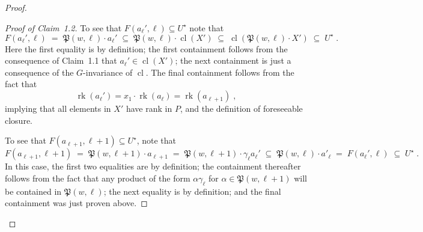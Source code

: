 \documentclass{article}
\theoremstyle{remark}
\theoremstyle{definition}
\DeclareMathOperator{\rk}{rk}
\DeclareMathOperator{\cl}{cl}
\newenvironment{subproof}[1][\proofname]{%
  \renewcommand{\qedsymbol}{$\blacksquare$}%
  \begin{proof}[#1]%
}{%
  \end{proof}%
}
\begin{document}
{\begin{proof}
\begin{subproof}[Proof of Claim~1.2]
To see that $F(a_\ell', \ell)\subseteq U^\star$ note that
  \[F(a_\ell', \ell)\;=\;\mathfrak{P}(w, \ell)\cdot a_\ell'
    \;\subseteq\; \mathfrak{P}(w, \ell)\cdot {\cl}(X')\;{\subseteq}
    \; {\cl}(\mathfrak{P}(w, \ell)\cdot  X')\;\subseteq \;U^\star\;.\]
Here the first equality is by definition; the  first containment follows from the consequence of Claim~1.1 that $a_\ell'\in{\cl}(X')$;  the {next} {containment}
is just a consequence of the {$G$-invariance of $\cl$. The}
final containment follows from the fact that $$\rk(a_\ell')=x_1\cdot\rk(a_\ell)=\rk(a_{\ell+1})\; ,$$ implying that all elements in $X'$ have rank in $P$, and the definition of foreseeable closure. 

To see that $F(a_{\ell+1}, \ell+1)\subseteq U^\star$, note that 
\[F(a_{\ell+1}, \ell+1)\;=\;\mathfrak{P}(w, \ell+1)\cdot  a_{\ell+1}\;=\;\mathfrak{P}(w, \ell+1)\cdot \gamma_\ell a_\ell'\;\subseteq\; \mathfrak{P}(w, \ell) \cdot a'_\ell\;=\; F(a_\ell', \ell)\;\subseteq\; U^\star\;.\]
In this case, the first two equalities are by definition; the  containment thereafter follows from the fact that any product of the form $\alpha\gamma_\ell$ for $\alpha\in \mathfrak{P}(w, \ell+1)$ will be contained in $\mathfrak{P}(w, \ell)$; the next equality is by definition; and the final containment was just proven above. 


\end{subproof}
\end{proof}}
\end{document}
